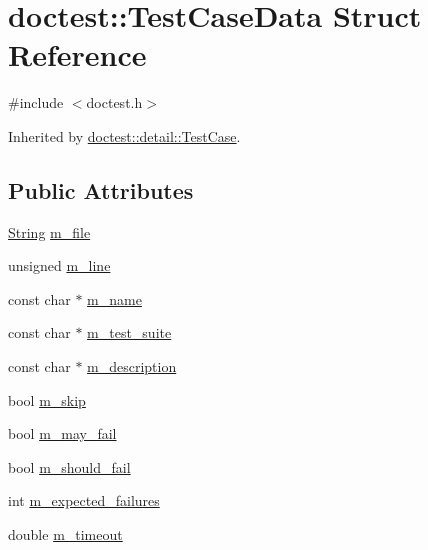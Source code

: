 \hypertarget{structdoctest_1_1_test_case_data}{}\section{doctest\+:\+:Test\+Case\+Data Struct Reference}
\label{structdoctest_1_1_test_case_data}


{\ttfamily \#include $<$doctest.\+h$>$}



Inherited by \mbox{\hyperlink{structdoctest_1_1detail_1_1_test_case}{doctest\+::detail\+::\+Test\+Case}}.

\subsection*{Public Attributes}
\begin{DoxyCompactItemize}
\item 
\mbox{\hyperlink{classdoctest_1_1_string}{String}} \mbox{\hyperlink{structdoctest_1_1_test_case_data_ac3e8095418a13cd7bbc921cce5b3c5c6}{m\+\_\+file}}
\item 
unsigned \mbox{\hyperlink{structdoctest_1_1_test_case_data_aaabb9765e7aa39416c058a9cbccef57f}{m\+\_\+line}}
\item 
const char $\ast$ \mbox{\hyperlink{structdoctest_1_1_test_case_data_a0cb34895130be773e624526d68e5b2cd}{m\+\_\+name}}
\item 
const char $\ast$ \mbox{\hyperlink{structdoctest_1_1_test_case_data_ae264da66ff0e88a34c467d364dd18840}{m\+\_\+test\+\_\+suite}}
\item 
const char $\ast$ \mbox{\hyperlink{structdoctest_1_1_test_case_data_abd855851b4b9edbaf46c3458abc1ba80}{m\+\_\+description}}
\item 
bool \mbox{\hyperlink{structdoctest_1_1_test_case_data_a0c2353bd3fd8c2fa84d34ab4e973e038}{m\+\_\+skip}}
\item 
bool \mbox{\hyperlink{structdoctest_1_1_test_case_data_a887b70bf52f74724f0d7fe99d43a8783}{m\+\_\+may\+\_\+fail}}
\item 
bool \mbox{\hyperlink{structdoctest_1_1_test_case_data_a037f6dfb931aff9c9b17f31203a3987e}{m\+\_\+should\+\_\+fail}}
\item 
int \mbox{\hyperlink{structdoctest_1_1_test_case_data_a6c5995f53ad39769bf06600e562ea9eb}{m\+\_\+expected\+\_\+failures}}
\item 
double \mbox{\hyperlink{structdoctest_1_1_test_case_data_a8cab4a7998b486bafa81498f93dd4d91}{m\+\_\+timeout}}
\end{DoxyCompactItemize}


